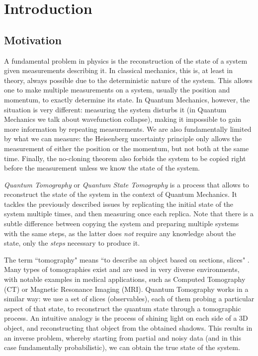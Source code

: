 \documentclass[12pt]{memoir}
\begin{document}
\chapter{Introduction}

\section{Motivation}
A fundamental problem in physics is the reconstruction of the state of a system given measurements describing it. In classical mechanics, this is, at least in theory, always possible due to the deterministic nature of the system. This allows one to make multiple measurements on a system, usually the position and momentum, to exactly determine its state. In Quantum Mechanics, however, the situation is very different: measuring the system disturbs it (in Quantum Mechanics we talk about wavefunction collapse), making it impossible to gain more information by repeating measurements. We are also fundamentally limited by what we can measure: the Heisenberg uncertainty principle only allows the measurement of either the position or the momentum, but not both at the same time. Finally, the no-cloning theorem also forbids the system to be copied right before the measurement unless we know the state of the system.\medbreak

\textit{Quantum Tomography} or \textit{Quantum State Tomography} is a process that allows to reconstruct the state of the system in the context of Quantum Mechanics. It tackles the previously described issues by replicating the initial state of the system multiple times, and then measuring once each replica. Note that there is a subtle difference between copying the system and preparing multiple systems with the same steps, as the latter does \textit{not} require any knowledge about the state, only the \textit{steps} necessary to produce it.\medbreak

The term ``tomography" means ``to describe an object based on sections, slices" \cite{wiki:tomography}. Many types of tomographies exist and are used in very diverse environments, with notable examples in medical applications, such as Computed Tomography (CT) or Magnetic Resonance Imaging (MRI). Quantum Tomography works in a similar way: we use a set of slices (observables), each of them probing a particular aspect of that state, to reconstruct the quantum state through a tomographic process. An intuitive analogy is the process of shining light on each side of a 3D object, and reconstructing that object from the obtained shadows. This results in an inverse problem, whereby starting from partial and noisy data (and in this case fundamentally probabilistic), we can obtain the true state of the system.
\end{document}
